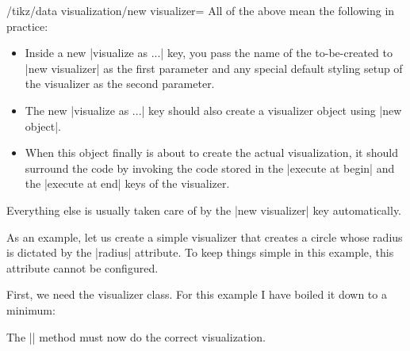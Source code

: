 \begin{key}{/tikz/data visualization/new
    visualizer=}
  All of the above mean the following in practice:
  \begin{itemize}
  \item Inside a new |visualize as ...| key, you pass the name of
    the to-be-created to |new visualizer| as the first parameter and
    any special default styling setup of the visualizer as the second
    parameter.
  \item The new |visualize as ...| key should also create a visualizer
    object using |new object|.
  \item When this object finally is about to create the actual
    visualization, it should surround the code by invoking the code
    stored in the |execute at begin| and the |execute at end| keys of
    the visualizer.
  \end{itemize}

  Everything else is usually taken care of by the |new visualizer| key
  automatically. 
\end{key}


As an example, let us create a simple visualizer that creates a
circle whose radius is dictated by the |radius| attribute. To keep
things simple in this example, this attribute cannot be configured.

First, we need the visualizer class. For this example I have boiled it
down to a minimum:


The |\dovisualization| method must now do the correct
visualization.


